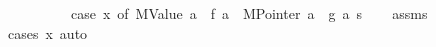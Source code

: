 \begin{isabellebody}
\ \ \ \ \ \ \ \ \ {\isacharequal}{\kern0pt}\ {\isacharparenleft}{\kern0pt}case\ x{\isacharprime}{\kern0pt}\ of\ {\isacharparenleft}{\kern0pt}MValue\ a{\isacharparenright}{\kern0pt}\ {\isasymRightarrow}\ f{\isacharprime}{\kern0pt}\ a\ {\isacharbar}{\kern0pt}\ {\isacharparenleft}{\kern0pt}MPointer\ a{\isacharparenright}{\kern0pt}\ {\isasymRightarrow}\ g{\isacharprime}{\kern0pt}\ a{\isacharparenright}{\kern0pt}\ s{\isachardoublequoteclose}\isanewline
%
\isadelimproof
\ \ %
\endisadelimproof
%
\isatagproof
{}\isamarkupfalse%
\ assms\ \isamarkupfalse%
\ {\isacharparenleft}{\kern0pt}cases\ x{\isacharcomma}{\kern0pt}\ auto{\isacharparenright}{\kern0pt}%
\endisatagproof
{\isafoldproof}%
%
\isadelimproof
\isanewline
%
\endisadelimproof
%
\isadelimtheory
\isanewline
%
\endisadelimtheory
%
\isatagtheory
{}\isamarkupfalse%
%
\endisatagtheory
{\isafoldtheory}%
%
\isadelimtheory
%
\endisadelimtheory
%
\end{isabellebody}%
\endinput
